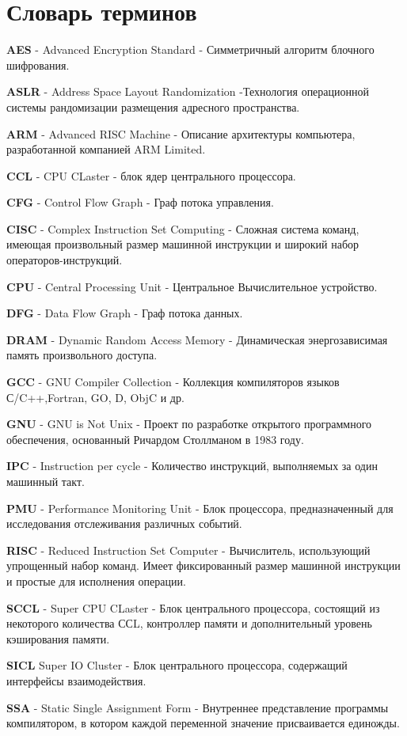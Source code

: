 \chapter*{Словарь терминов}             %

\textbf{AES} - Advanced Encryption Standard  - Симметричный алгоритм блочного шифрования.

\textbf{ASLR} - Address Space Layout Randomization -Технология операционной системы рандомизации размещения адресного пространства.

\textbf{ARM} - Advanced RISC Machine - Описание архитектуры компьютера, разработанной компанией  ARM Limited.

\textbf{CCL} - CPU CLaster - блок ядер центрального процессора.

\textbf{CFG} - Control Flow Graph - Граф потока управления.

\textbf{CISC} - Complex Instruction Set Computing  - Сложная система команд, имеющая произвольный размер машинной инструкции и широкий набор операторов-инструкций.

\textbf{CPU} - Central Processing Unit - Центральное Вычислительное устройство.

\textbf{DFG} - Data Flow Graph  - Граф потока данных.

\textbf{DRAM} - Dynamic Random Access Memory - Динамическая энергозависимая память произвольного доступа.

\textbf{GCC} - GNU Compiler Collection - Коллекция компиляторов языков С/C++,Fortran, GO, D, ObjC и др.

\textbf{GNU} - GNU is Not Unix - Проект по разработке открытого программного обеспечения, основанный Ричардом Столлманом в 1983 году.

\textbf{IPC} - Instruction per cycle - Количество инструкций, выполняемых за один машинный такт. 

\textbf{PMU} - Performance Monitoring Unit - Блок процессора, предназначенный для исследования отслеживания различных событий.

\textbf{RISC} - Reduced Instruction Set Computer -  Вычислитель, использующий упрощенный набор команд. Имеет фиксированный размер машинной инструкции и простые для исполнения операции. 

\textbf{SCCL} - Super CPU CLaster - Блок центрального процессора, состоящий из некоторого количества ССL, контроллер памяти и  дополнительный уровень кэширования памяти.

\textbf{SICL} Super IO Cluster - Блок центрального процессора, содержащий интерфейсы взаимодействия.

\textbf{SSA} - Static Single Assignment Form - Внутреннее представление программы компилятором, в котором каждой переменной значение присваивается единожды.





